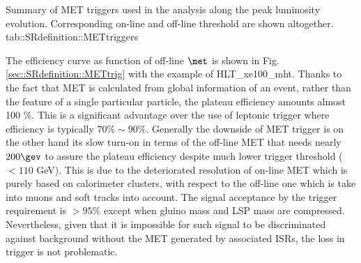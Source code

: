 {Summary of MET triggers used in the analysis along the peak luminosity evolution. Corresponding on-line and off-line threshold are shown altogether.}
{tab::SRdefinition::METtriggers}


The efficiency curve as function of off-line $\met$ is shown in Fig. \ref{sec::SRdefinition::METtrig} with the example of HLT\_xe100\_mht.
Thanks to the fact that MET is calculated from global information of an event, rather than the feature of a single particular particle, the plateau efficiency amounts almost 100 $\%$. 
This is a significant advantage over the use of leptonic trigger where efficiency is typically $70\% \sim 90\%$. 
Generally the downside of MET trigger is on the other hand its slow turn-on in terms of the off-line MET that needs nearly $200 \gev$ to assure the plateau efficiency despite much lower trigger threshold ($<110$ GeV). This is due to the deteriorated resolution of on-line MET which is purely based on calorimeter clusters, with respect to the off-line one which is take into muons and soft tracks into account. The signal acceptance by the trigger requirement is  $>95\%$ except when gluino mass and LSP mass are compressed. Nevertheless, given that it is impossible for such signal to be discriminated against background without the MET generated by associated ISRs, the loss in trigger is not problematic. \\

